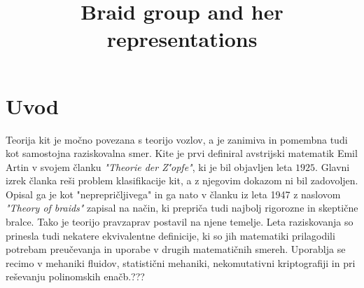\documentclass[mat1]{fmfdelo}
\title{Braid group and her representations}
\begin{document}
\section{Uvod}

Teorija kit je močno povezana s teorijo vozlov, a je zanimiva in pomembna tudi kot samostojna raziskovalna smer. Kite je prvi definiral avstrijski matematik Emil Artin v svojem članku \emph{"Theorie der Z\''{o}pfe"}, ki je bil objavljen leta $1925$. Glavni izrek članka reši problem klasifikacije kit, a z njegovim dokazom ni bil zadovoljen. Opisal ga je kot "neprepričljivega" in ga nato v članku iz leta 1947 z naslovom \emph{"Theory of braids"} zapisal na način, ki prepriča tudi najbolj rigorozne in skeptične bralce. Tako je teorijo pravzaprav postavil na njene temelje. Leta raziskovanja so prinesla tudi nekatere ekvivalentne definicije, ki so jih matematiki prilagodili potrebam preučevanja in uporabe v drugih matematičnih smereh. Uporablja se recimo v mehaniki fluidov, statistični mehaniki, nekomutativni kriptografiji in pri reševanju polinomskih enačb.???

%
%
%
%
%
%
%
%
\end{document}
